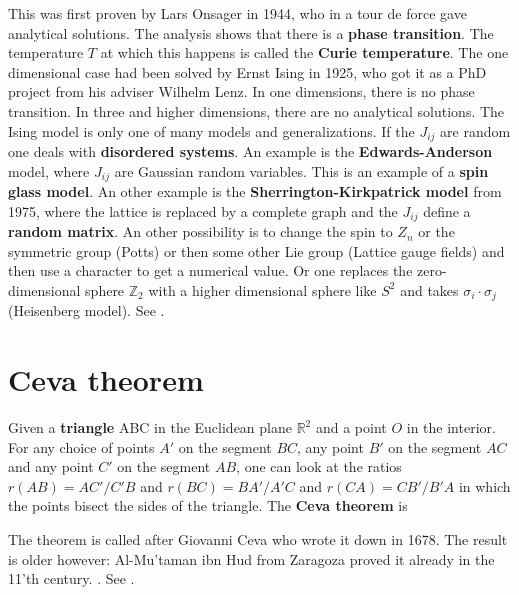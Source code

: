 \documentclass[12pt]{amsart}
\def\satz#1{ \vspace{2mm} \begin{center} \fcolorbox{yellow1}{yellow1}{ \parbox{14.0cm}{{\bf Theorem:} #1}} \vspace{2mm} \end{center} }
\newcounter{example}    \def\example#1{ \item \fontsize{12}{15} \selectfont #1 \fontsize{12}{15} \selectfont }
\begin{document}
This was first proven by Lars Onsager in 1944, who in a tour de force
gave analytical solutions. The analysis shows that there is a {\bf phase transition}.
The temperature $T$ at which this happens is called the {\bf Curie temperature}.
The one dimensional case had been solved by Ernst Ising in 1925, who got it as
a PhD project from his adviser Wilhelm Lenz. In one dimensions, there is no
phase transition. In three and higher dimensions, there are no analytical solutions.
The Ising model is only one of many models and generalizations. If the $J_{ij}$ are
random one deals with {\bf disordered systems}. An example is the {\bf Edwards-Anderson}
model, where $J_{ij}$ are Gaussian random variables. This is an example of a
{\bf spin glass model}. An other example is the {\bf Sherrington-Kirkpatrick model}
from 1975, where the lattice is replaced by a complete graph and the $J_{ij}$ define
a {\bf random matrix}. An other possibility is to change the spin to $Z_n$ or the
symmetric group (Potts) or then some other Lie group (Lattice gauge fields) and
then use a character to get a numerical value. Or one replaces the zero-dimensional
sphere $\mathbb{Z}_2$ with a higher dimensional sphere like $S^2$ and takes 
$\sigma_i \cdot \sigma_j$ (Heisenberg model). See \cite{SimonStatMechanics}.

\section{Ceva theorem}

Given a {\bf triangle} ABC in the Euclidean plane $\mathbb{R}^2$ and a point $O$ in the interior.
For any choice of points $A'$ on the segment $BC$, any point $B'$ on the segment $AC$
and any point $C'$ on the segment $AB$, one can look at the ratios
$r(AB)= AC'/C'B$ and $r(BC)=BA'/A'C$ and $r(CA)=CB'/B'A$ in which the points bisect
the sides of the triangle. The {\bf Ceva theorem} is

\satz{ $r(AB) r(BC) r(CA) = 1$ }

The theorem is called after Giovanni Ceva who wrote it down in 1678. The result is older however:
Al-Mu'taman ibn Hud from Zaragoza  proved it already in the 11'th century. \cite{Hogendijk}.
See \cite{Russell1893}.
\end{document}

